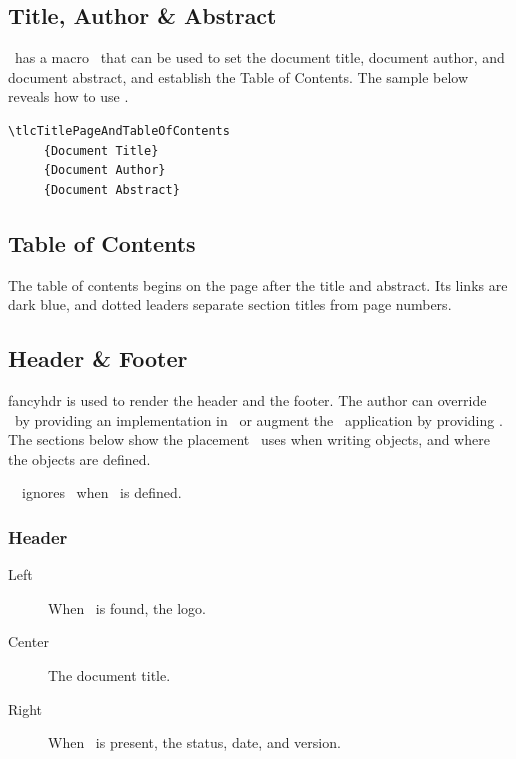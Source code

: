 \documentclass[12pt]{tlc-article}
\begin{document}
\subsection{Title, Author \& Abstract} \label{sec:TAA}
\tlcA\ has a macro \tlcTOC\ that can be used to set the document title, document
author, and document abstract, and establish the Table of Contents.  The sample
below reveals how to use \tlcTOC.

\begin{lstlisting}[basicstyle=\ttfamily\tiny]
  \tlcTitlePageAndTableOfContents
     {Document Title}
     {Document Author}
     {Document Abstract}
\end{lstlisting}


\subsection{Table of Contents}
The table of contents begins on the page after the title and abstract. Its links
are dark blue, and dotted leaders separate section titles from page numbers.


\subsection{Header \& Footer}
fancyhdr is used to render the header and the footer.  The author can override
\tlcA\ by providing an implementation in \tlcHF\, or augment the \tlcA\
application by providing \tlcVE. The sections below show the placement \tlcA\
uses when writing objects, and where the objects are defined.

\tlcVspace

\tlcNote\ \tlcA\ ignores \tlcVE\ when \tlcHF\ is defined.


\subsubsection*{Header}
\begin{description}
  \item[Left] When \tlcLG\ is found, the logo.
  \item[Center] The document title.
  \item[Right] When \tlcVE\ is present, the status, date, and version.
\end{description}
\end{document}
